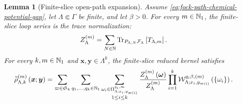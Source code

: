 \documentclass[11pt,a4paper]{article}
\theoremstyle{plain}
\newtheorem{lem}[thm]{Lemma}
\theoremstyle{definition}
\theoremstyle{remark}
\begin{document}
\begin{lem}[Finite-slice open-path expansion]\label{lem:fock-finite-slice-open-path-expansion}
Assume \eqref{eq:fock-path-chemical-potential-gap}, let $\Lambda\Subset\Gamma$ be finite, and let $\beta>0$.
For every $m\in\mathbb{N}_1$, the finite-slice loop series is the trace normalization:
\begin{equation}
\begin{aligned}
Z_{\Lambda}^{(m)}
& =
\sum_{N\in\monnat}
\sqfun{\trace_{P_{\Lambda,N}\sphilb{F}_{\Lambda}}}{T_{\Lambda,m}}.
\end{aligned}
\label{eq:fock-finite-slice-partition-trace-identity}
\end{equation}
For every $k,m\in\mathbb{N}_1$ and $\boldsymbol{x},\boldsymbol{y}\in\Lambda^k$, the finite-slice reduced kernel
satisfies
\begin{equation}
\begin{aligned}
\fun{\widetilde{\rho}_{\Lambda,k}^{(m)}}{\boldsymbol{x};\boldsymbol{y}}
& =
\sum_{\varpi \in \grsym{k}}
\sum_{q_1,\ldots,q_k \in \semigrposint}
\sum_{\substack{
\omega_i \in \Omega_{\Lambda;x_i,y_{\fun{\varpi}{i}}}^{q_i,m}\\
1 \leq i \leq k}}
\frac{\fun{Z_{\Lambda}^{(m)}}{\boldsymbol{\omega}}}{Z_{\Lambda}^{(m)}}
\prod_{i = 1}^{k}
\fun{\msrcal{W}_{\Lambda;x_i,y_{\fun{\varpi}{i}}}^{q_i\beta,(m)}}{\setone{\omega_i}}.
\end{aligned}
\label{eq:fock-finite-slice-open-path-expansion}
\end{equation}
\end{lem}
\end{document}
